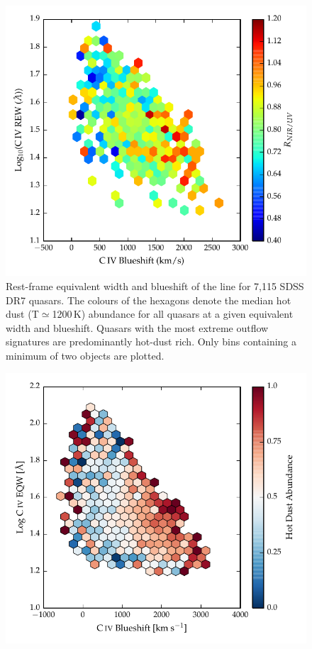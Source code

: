 \begin{figure}
\centering
  \includegraphics[width=\columnwidth]{figures/chapter05/hot_dust_ratio.pdf}
  \caption{Rest-frame equivalent width and blueshift of the  line for 7,115 SDSS DR7 quasars. The colours of the hexagons denote the median hot dust (T$\simeq$1200\,K) abundance for all quasars at a given equivalent width and blueshift. Quasars with the most extreme outflow signatures are predominantly hot-dust rich. Only bins containing a minimum of two objects are plotted.}
  \label{fig:civ_hot_dust}
\end{figure}

\begin{figure}
\centering
  \includegraphics[width=\columnwidth]{figures/chapter05/hot_dust_beta.pdf}
\caption{}
  \label{fig:}
\end{figure}

